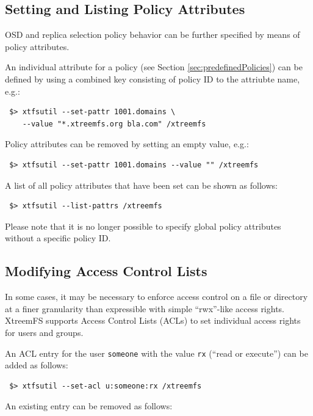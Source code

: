 \documentclass[a4paper,10pt]{book}
\begin{document}
\subsection{Setting and Listing Policy Attributes}
\label{sec:policyAttributes}

OSD and replica selection policy behavior can be further specified by means of policy attributes.

An individual attribute for a policy (see Section \ref{sec:predefinedPolicies}) can be defined by using a combined key consisting of policy ID to the attriubte name, e.g.:

\begin{verbatim}
 $> xtfsutil --set-pattr 1001.domains \
    --value "*.xtreemfs.org bla.com" /xtreemfs
\end{verbatim}

Policy attributes can be removed by setting an empty value, e.g.:

\begin{verbatim}
 $> xtfsutil --set-pattr 1001.domains --value "" /xtreemfs
\end{verbatim}

A list of all policy attributes that have been set can be shown as follows:

\begin{verbatim}
 $> xtfsutil --list-pattrs /xtreemfs
\end{verbatim}

Please note that it is no longer possible to specify global policy attributes without a specific policy ID.

\subsection{Modifying Access Control Lists}

In some cases, it may be necessary to enforce access control on a file or directory at a finer granularity than expressible with simple ``rwx''-like access rights. XtreemFS supports Access Control Lists (ACLs) to set individual access rights for users and groups.

An ACL entry for the user \texttt{someone} with the value \texttt{rx} (``read or execute'') can be added as follows:

\begin{verbatim}
 $> xtfsutil --set-acl u:someone:rx /xtreemfs
\end{verbatim}

An existing entry can be removed as follows:
\end{document}
